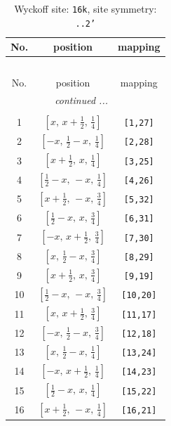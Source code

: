 \documentclass[fleqn,8pt]{jsarticle}
\begin{document}
\renewcommand{\arraystretch}{1.2}
\begin{longtable}{ccc}
\caption{Wyckoff site: {\tt 16k}, site symmetry: {\tt ..2'}}
 \\
 \hline \hline
No. & position & mapping \\ \hline \endfirsthead

\multicolumn{2}{l}{\tablename\ \thetable{}} \\
 \hline \hline
No. & position & mapping \\ \hline \endhead

 \hline \hline
\multicolumn{2}{r}{\footnotesize\it continued ...} \\ \endfoot

 \hline \hline
\multicolumn{2}{r}{} \\ \endlastfoot

1 & $\left[ x,\, x + \frac{1}{2},\, \frac{1}{4} \right]$ & {\tt [1,27]} \\ \hline
2 & $\left[ - x,\, \frac{1}{2} - x,\, \frac{1}{4} \right]$ & {\tt [2,28]} \\ \hline
3 & $\left[ x + \frac{1}{2},\, x,\, \frac{1}{4} \right]$ & {\tt [3,25]} \\ \hline
4 & $\left[ \frac{1}{2} - x,\, - x,\, \frac{1}{4} \right]$ & {\tt [4,26]} \\ \hline
5 & $\left[ x + \frac{1}{2},\, - x,\, \frac{3}{4} \right]$ & {\tt [5,32]} \\ \hline
6 & $\left[ \frac{1}{2} - x,\, x,\, \frac{3}{4} \right]$ & {\tt [6,31]} \\ \hline
7 & $\left[ - x,\, x + \frac{1}{2},\, \frac{3}{4} \right]$ & {\tt [7,30]} \\ \hline
8 & $\left[ x,\, \frac{1}{2} - x,\, \frac{3}{4} \right]$ & {\tt [8,29]} \\ \hline
9 & $\left[ x + \frac{1}{2},\, x,\, \frac{3}{4} \right]$ & {\tt [9,19]} \\ \hline
10 & $\left[ \frac{1}{2} - x,\, - x,\, \frac{3}{4} \right]$ & {\tt [10,20]} \\ \hline
11 & $\left[ x,\, x + \frac{1}{2},\, \frac{3}{4} \right]$ & {\tt [11,17]} \\ \hline
12 & $\left[ - x,\, \frac{1}{2} - x,\, \frac{3}{4} \right]$ & {\tt [12,18]} \\ \hline
13 & $\left[ x,\, \frac{1}{2} - x,\, \frac{1}{4} \right]$ & {\tt [13,24]} \\ \hline
14 & $\left[ - x,\, x + \frac{1}{2},\, \frac{1}{4} \right]$ & {\tt [14,23]} \\ \hline
15 & $\left[ \frac{1}{2} - x,\, x,\, \frac{1}{4} \right]$ & {\tt [15,22]} \\ \hline
16 & $\left[ x + \frac{1}{2},\, - x,\, \frac{1}{4} \right]$ & {\tt [16,21]} \\
\end{longtable}
\end{document}
